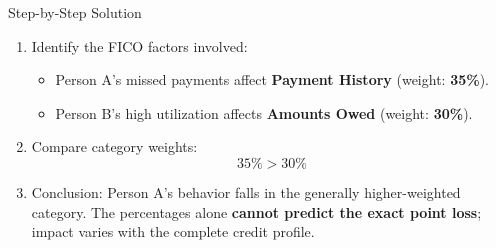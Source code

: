 \begin{block}{Step-by-Step Solution}
  \begin{enumerate}
    \item Identify the FICO factors involved:
      \begin{itemize}
        \item Person A's missed payments affect \textbf{Payment History} (weight: \textbf{35\%}).
        \item Person B's high utilization affects \textbf{Amounts Owed} (weight: \textbf{30\%}).
      \end{itemize}
    \item Compare category weights:
      \[
        35\% > 30\%
      \]
    \item Conclusion: Person A's behavior falls in the generally higher-weighted category. The percentages alone \textbf{cannot predict the exact point loss}; impact varies with the complete credit profile.
  \end{enumerate}
\end{block}
